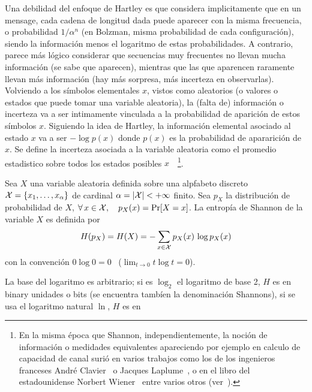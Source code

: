 Una debilidad del  enfoque de Hartley es que considera  implicitamente que en un
mensage, cada cadena de longitud dada  puede aparecer con la misma frecuencia, o
probabilidad   $1/\alpha^n$   (en    Bolzman,   misma   probabilidad   de   cada
configuraci\'on),  siendo   la  informaci\'on   menos  el  logaritmo   de  estas
probabilidades.  A  contrario, parece  m\'as l\'ogico considerar  que secuencias
muy frecuentes  no llevan mucha  informaci\'on (se sabe que  aparecen), mientras
que las que aparencen raramente  llevan m\'as informaci\'on (hay m\'as sorpresa,
m\'as incerteza  en observarlas).  Volviendo  a los s\'imbolos  elementales $x$,
vistos  como  aleatorios (o  valores  o estados  que  puede  tomar una  variable
aleatoria),  la  (falta de)  informaci\'on  o  incerteza  va a  ser  intimamente
vinculada a la probabilidad de aparici\'on de estos s\'imbolos $x$. Siguiendo la
idea de Hartley,  la informaci\'on elemental asociado al estado $x$  va a ser $-
\log p(x)$ donde  $p(x)$ es la probabilidad de apararici\'on  de $x$.  Se define
la incerteza asociada a la variable aleatoria como el promedio estadistico sobre
todos  los  estados posibles  $x$~\cite{Sha48,  ShaWea64}~\footnote{En la  misma
  \'epoca  que  Shannon,  independientemente,  la noci\'on  de  informaci\'on  o
  medidades  equivalentes apareciendo  por ejemplo  en calculo  de  capacidad de
  canal suri\'o en varios trabajos  como los de los ingenieros franceses Andr\'e
  Clavier~\cite{Cla48}  o  Jacques  Laplume~\cite{Lap48},  o  en  el  libro  del
  estadounidense   Norbert  Wiener~\cite[Cap.~III]{Wie48}  entre   varios  otros
  (ver~\cite{Ver98, Lun02, RioMag14, FlaRio16, RioFla17, Che17}).}.
%
\begin{definicion}\label{def:SZ:Shannon}
  Sea $X$ una variable aleatoria definida  sobre una alpfabeto discreto $\mathcal{X} = \{
  x_1 , \ldots , x_\alpha \}$ de cardinal $\alpha = |\mathcal{X}| < + \infty$ finito. Sea
  $p_X$ la  distribuci\'on de probabilidad  de $X$, \ie  $ \forall \, x  \in \mathcal{X},
  \quad p_X(x) =  \Pr[X = x]$.  La  entrop\'ia de Shannon de la  variable $X$ es
  definida por
  \[
    H(p_X) = H(X) = - \sum_{x \in \mathcal{X}} p_X(x) \, \log p_X(x)
  \]
  con la convenci\'on $0 \log 0 = 0$ \ ($\displaystyle \lim_{t \to 0} t \log t =
  0$).
\end{definicion}
%
\noindent La  base del logaritmo es  arbitrario; si es $\log_2$  el logaritmo de
base  2,  $H$  es  en  binary   unidades  o  bits  (se  encuentra  tamb\'ien  la
denominaci\'on  Shannons), si  se  usa el  logaritmo  natural $\ln$,  $H$ es  en
